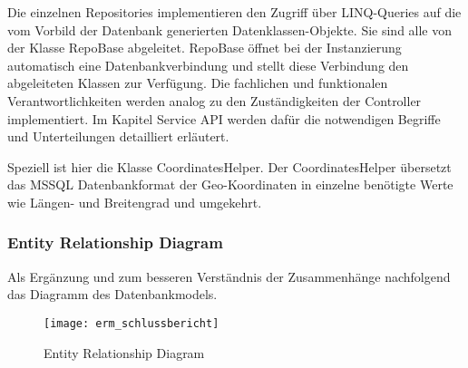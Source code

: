 Die einzelnen Repositories implementieren den Zugriff \"uber LINQ-Queries auf die vom Vorbild der Datenbank generierten
Datenklassen\--Objekte. Sie sind alle von der Klasse RepoBase abgeleitet. RepoBase \"offnet bei der Instanzierung
automatisch eine Datenbankverbindung und stellt diese Verbindung den abgeleiteten Klassen zur Verf\"ugung. Die fachlichen und
funktionalen Verantwortlichkeiten werden analog zu den Zust\"andigkeiten der Controller implementiert. Im Kapitel
Service API werden daf\"ur die notwendigen Begriffe und Unterteilungen detailliert erl\"autert.

Speziell ist hier die Klasse CoordinatesHelper.
Der CoordinatesHelper \"ubersetzt das MSSQL Datenbankformat der Geo-Koordinaten in einzelne ben\"otigte Werte wie
L\"angen- und Breitengrad und umgekehrt.

\newpage
\subsubsection{Entity Relationship Diagram}\label{erm}
Als Erg\"anzung und zum besseren Verst\"andnis der Zusammenh\"ange nachfolgend das Diagramm des Datenbankmodels.

\begin{figure}
  \centering
  \texttt{[image: erm\_schlussbericht]}
  \caption{Entity Relationship Diagram}
\end{figure}
